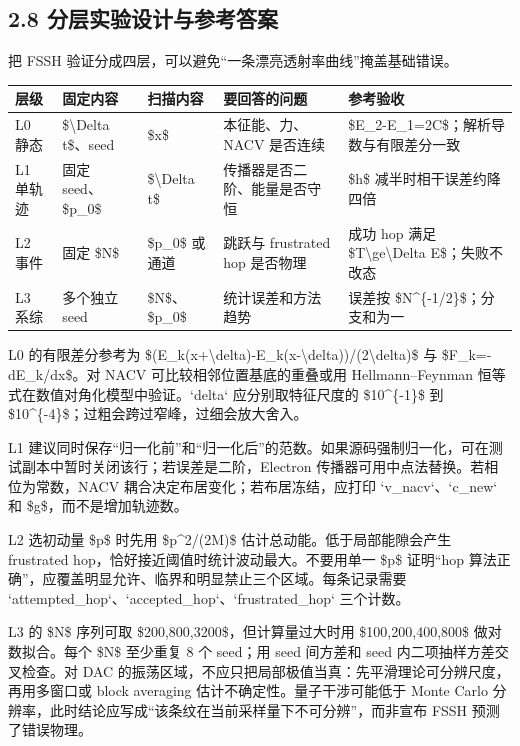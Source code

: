 \documentclass[UTF8,openany,11pt,fontset=fandol]{ctexbook}
\begin{document}
\subsection{\texorpdfstring{\textbf{2.8
分层实验设计与参考答案}}{2.8 分层实验设计与参考答案}}\label{ux5206ux5c42ux5b9eux9a8cux8bbeux8ba1ux4e0eux53c2ux8003ux7b54ux6848}

把 FSSH 验证分成四层，可以避免``一条漂亮透射率曲线''掩盖基础错误。

\begin{longtable}[]{@{}lllll@{}}
\toprule
\textbf{层级} & \textbf{固定内容} & \textbf{扫描内容} &
\textbf{要回答的问题} & \textbf{参考验收}\tabularnewline
\midrule
\endhead
L0 静态 & \$\textbackslash Delta t\$、seed & \$x\$ & 本征能、力、NACV
是否连续 & \$E\_2-E\_1=2C\$；解析导数与有限差分一致\tabularnewline
L1 单轨迹 & 固定 seed、\$p\_0\$ & \$\textbackslash Delta t\$ &
传播器是否二阶、能量是否守恒 & \$h\$
减半时相干误差约降四倍\tabularnewline
L2 事件 & 固定 \$N\$ & \$p\_0\$ 或通道 & 跳跃与 frustrated hop 是否物理
& 成功 hop 满足 \$T\textbackslash ge\textbackslash Delta
E\$；失败不改态\tabularnewline
L3 系综 & 多个独立 seed & \$N\$、\$p\_0\$ & 统计误差和方法趋势 & 误差按
\$N\^{}\{-1/2\}\$；分支和为一\tabularnewline
\bottomrule
\end{longtable}

L0 的有限差分参考为
\$(E\_k(x+\textbackslash delta)-E\_k(x-\textbackslash delta))/(2\textbackslash delta)\$
与 \$F\_k=-dE\_k/dx\$。对 NACV 可比较相邻位置基底的重叠或用
Hellmann--Feynman 恒等式在数值对角化模型中验证。`delta`
应分别取特征尺度的 \$10\^{}\{-1\}\$ 到
\$10\^{}\{-4\}\$；过粗会跨过窄峰，过细会放大舍入。

L1
建议同时保存``归一化前''和``归一化后''的范数。如果源码强制归一化，可在测试副本中暂时关闭该行；若误差是二阶，Electron
传播器可用中点法替换。若相位为常数，NACV
耦合决定布居变化；若布居冻结，应打印 `v\_nacv`、`c\_new` 和
\$g\$，而不是增加轨迹数。

L2 选初动量 \$p\$ 时先用 \$p\^{}2/(2M)\$ 估计总动能。低于局部能隙会产生
frustrated hop，恰好接近阈值时统计波动最大。不要用单一 \$p\$ 证明``hop
算法正确''，应覆盖明显允许、临界和明显禁止三个区域。每条记录需要
`attempted\_hop`、`accepted\_hop`、`frustrated\_hop` 三个计数。

L3 的 \$N\$ 序列可取 \$200,800,3200\$，但计算量过大时用
\$100,200,400,800\$ 做对数拟合。每个 \$N\$ 至少重复 8 个 seed；用 seed
间方差和 seed 内二项抽样方差交叉检查。对 DAC
的振荡区域，不应只把局部极值当真：先平滑理论可分辨尺度，再用多窗口或
block averaging 估计不确定性。量子干涉可能低于 Monte Carlo
分辨率，此时结论应写成``该条纹在当前采样量下不可分辨''，而非宣布 FSSH
预测了错误物理。
\end{document}
